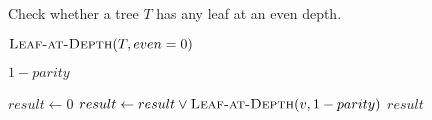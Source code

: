 
\begin{algorithm}[H]
  \caption{Check whether a tree $T$ has any leaf at an even depth.}
  \label{alg:leaf-at-even-depth}
  \begin{algorithmic}[1]
      \State \Return $\Call{Leaf-at-Depth}{T, even = 0}$
    \EndProcedure

    \Statex
     
        \State \Return $1-parity$
      \EndIf

      \hStatex
      \State $result \gets 0$
	\State $result \gets result \lor \Call{Leaf-at-Depth}{v, 1-parity}$
      \EndFor
      \State \Return $result$
    \EndProcedure
  \end{algorithmic}
\end{algorithm}


